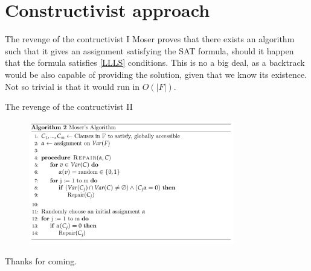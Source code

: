 \documentclass{beamer}
\begin{document}
\section{Constructivist approach}
\begin{frame}{The revenge of the contructivist I}
Moser proves that there exists an algorithm such that it gives an assignment satisfying the SAT formula, should it happen that the formula satisfies \ref{LLLS} conditions. This is no a big deal, as a backtrack would be also capable of providing the solution, given that we know its existence. Not so trivial is that it would run in $O(|F|)$. 
\end{frame}


\begin{frame}{The revenge of the contructivist II}
\begin{figure}[h]
\includegraphics[width=0.8\textwidth]{screenshot.png}
\end{figure}
\end{frame}














\begin{frame}[standout]
  Thanks for coming.
\end{frame}
\end{document}
